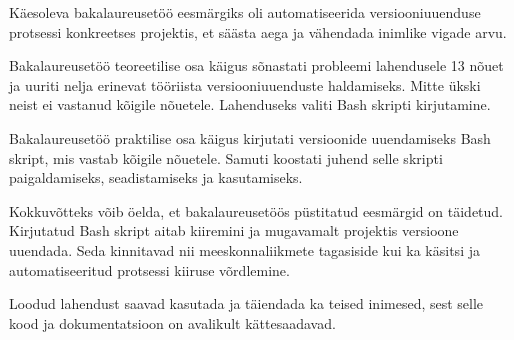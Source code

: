 \documentclass[12pt]{article}
\begin{document}
  Käesoleva bakalaureusetöö eesmärgiks oli automatiseerida versiooniuuenduse protsessi konkreetses projektis, et säästa aega ja vähendada inimlike vigade arvu.
  
  Bakalaureusetöö teoreetilise osa käigus sõnastati probleemi lahendusele 13 nõuet ja uuriti nelja erinevat tööriista versiooniuuenduste haldamiseks. Mitte ükski neist ei vastanud kõigile nõuetele. Lahenduseks valiti Bash skripti kirjutamine.
  
  Bakalaureusetöö praktilise osa käigus kirjutati versioonide uuendamiseks Bash skript, mis vastab kõigile nõuetele. Samuti koostati juhend selle skripti paigaldamiseks, seadistamiseks ja kasutamiseks.
  
  Kokkuvõtteks võib öelda, et bakalaureusetöös püstitatud eesmärgid on täidetud. Kirjutatud Bash skript aitab kiiremini ja mugavamalt projektis versioone uuendada. Seda kinnitavad nii meeskonnaliikmete tagasiside kui ka käsitsi ja automatiseeritud protsessi kiiruse võrdlemine.
  
  Loodud lahendust saavad kasutada ja täiendada ka teised inimesed, sest selle kood ja dokumentatsioon on avalikult kättesaadavad.

  \newpage
  
\end{document}
